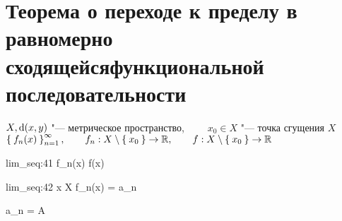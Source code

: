 \section{Теорема о переходе к пределу в равномерно сходящейся\n функциональной последовательности}

\begin{theorem}
	$ X, \operatorname{d}(x, y) $ "--- метрическое пространство, $ \qquad x_0 \in X $ "--- точка сгущения $ X $ \\
	$ \Set{f_n(x)}_{n=1}^{\infty}, \qquad f_n : X \setminus \Set{x_0} \to \mathbb{R}, \qquad f : X \setminus \Set{x_0} \to \mathbb{R} $
	\begin{equ}{lim_seq:41}
		f_n(x)  f(x)
	\end{equ}
	\begin{equ}{lim_seq:42}
		\forall x \in X \setminus {} \quad \exist {} f_n(x) = a_n
	\end{equ}
	\begin{mequ}[\implies \empheqlbrace]
		 \exist {} a_n = A \in \R \\
		 \exist {}
	\end{mequ}
\end{theorem}

